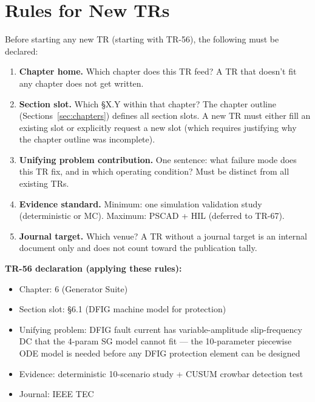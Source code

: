 \documentclass[11pt, a4paper]{article}
\begin{document}
\section{Rules for New TRs}
\label{sec:rules}

Before starting any new TR (starting with TR-56), the following must be declared:

\begin{enumerate}
  \item \textbf{Chapter home.}  Which chapter does this TR feed?
    A TR that doesn't fit any chapter does not get written.

  \item \textbf{Section slot.}  Which §X.Y within that chapter?
    The chapter outline (Sections~\ref{sec:chapters}) defines all section slots.
    A new TR must either fill an existing slot or explicitly request a new slot
    (which requires justifying why the chapter outline was incomplete).

  \item \textbf{Unifying problem contribution.}  One sentence: what failure mode
    does this TR fix, and in which operating condition?  Must be distinct from
    all existing TRs.

  \item \textbf{Evidence standard.}  Minimum: one simulation validation study
    (deterministic or MC).  Maximum: PSCAD + HIL (deferred to TR-67).

  \item \textbf{Journal target.}  Which venue?  A TR without a journal target is
    an internal document only and does not count toward the publication tally.
\end{enumerate}

\textbf{TR-56 declaration (applying these rules):}
\begin{itemize}[nosep]
  \item Chapter: 6 (Generator Suite)
  \item Section slot: §6.1 (DFIG machine model for protection)
  \item Unifying problem: DFIG fault current has variable-amplitude slip-frequency
    DC that the 4-param SG model cannot fit — the 10-parameter piecewise ODE
    model is needed before any DFIG protection element can be designed
  \item Evidence: deterministic 10-scenario study + CUSUM crowbar detection test
  \item Journal: IEEE TEC
\end{itemize}
\end{document}
